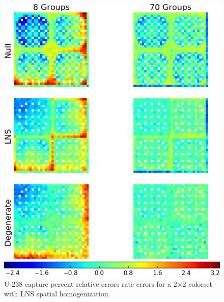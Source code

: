 \begin{figure}[h!]
\centering
\includegraphics[width=\linewidth]{figures/patterns/lns/reflector/capt-err}
\vspace{2mm}
\caption[U-238 capture rate errors for a 2$\times$2 colorset with a reflector]{U-238 capture percent relative errors rate errors for a 2$\times$2 colorset with \ac{LNS} spatial homogenization.}
\label{fig:chap9-reflector-lns-capt-err}
\end{figure}

\clearpage



